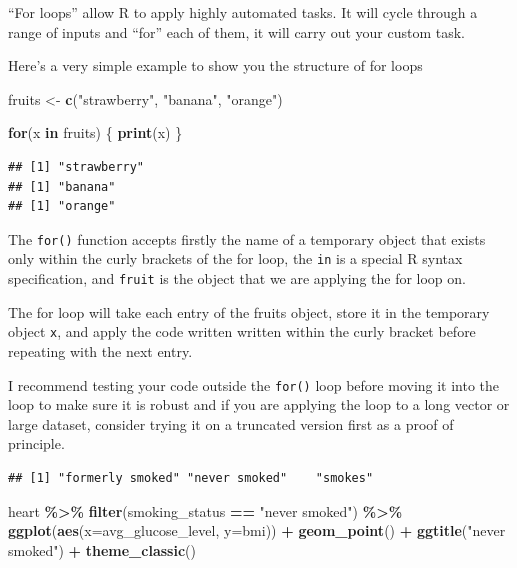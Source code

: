 \documentclass[
]{book}
\newenvironment{Shaded}{\begin{snugshade}}{\end{snugshade}}
\newcommand{\AttributeTok}[1]{\textcolor[rgb]{0.13,0.29,0.53}{#1}}
\newcommand{\ControlFlowTok}[1]{\textcolor[rgb]{0.13,0.29,0.53}{\textbf{#1}}}
\newcommand{\FunctionTok}[1]{\textcolor[rgb]{0.13,0.29,0.53}{\textbf{#1}}}
\newcommand{\NormalTok}[1]{#1}
\newcommand{\OtherTok}[1]{\textcolor[rgb]{0.56,0.35,0.01}{#1}}
\newcommand{\SpecialCharTok}[1]{\textcolor[rgb]{0.81,0.36,0.00}{\textbf{#1}}}
\newcommand{\StringTok}[1]{\textcolor[rgb]{0.31,0.60,0.02}{#1}}
\begin{document}
``For loops'' allow R to apply highly automated tasks. It will cycle through a range of inputs and ``for'' each of them, it will carry out your custom task.

Here's a very simple example to show you the structure of for loops

\begin{Shaded}
\begin{Highlighting}[]
\NormalTok{fruits }\OtherTok{\textless{}{-}} \FunctionTok{c}\NormalTok{(}\StringTok{"strawberry"}\NormalTok{, }\StringTok{"banana"}\NormalTok{, }\StringTok{"orange"}\NormalTok{)}

\ControlFlowTok{for}\NormalTok{(x }\ControlFlowTok{in}\NormalTok{ fruits) \{}
  \FunctionTok{print}\NormalTok{(x)}
\NormalTok{\}}
\end{Highlighting}
\end{Shaded}

\begin{verbatim}
## [1] "strawberry"
## [1] "banana"
## [1] "orange"
\end{verbatim}

The \texttt{for()} function accepts firstly the name of a temporary object that exists only within the curly brackets of the for loop, the \texttt{in} is a special R syntax specification, and \texttt{fruit} is the object that we are applying the for loop on.

The for loop will take each entry of the fruits object, store it in the temporary object \texttt{x}, and apply the code written written within the curly bracket before repeating with the next entry.

I recommend testing your code outside the \texttt{for()} loop before moving it into the loop to make sure it is robust and if you are applying the loop to a long vector or large dataset, consider trying it on a truncated version first as a proof of principle.

\begin{Shaded}
\end{Shaded}

\begin{verbatim}
## [1] "formerly smoked" "never smoked"    "smokes"
\end{verbatim}

\begin{Shaded}
\begin{Highlighting}[]
\NormalTok{heart }\SpecialCharTok{\%\textgreater{}\%} 
  \FunctionTok{filter}\NormalTok{(smoking\_status }\SpecialCharTok{==} \StringTok{"never smoked"}\NormalTok{) }\SpecialCharTok{\%\textgreater{}\%} 
  \FunctionTok{ggplot}\NormalTok{(}\FunctionTok{aes}\NormalTok{(}\AttributeTok{x=}\NormalTok{avg\_glucose\_level, }\AttributeTok{y=}\NormalTok{bmi)) }\SpecialCharTok{+}
  \FunctionTok{geom\_point}\NormalTok{() }\SpecialCharTok{+} 
  \FunctionTok{ggtitle}\NormalTok{(}\StringTok{"never smoked"}\NormalTok{) }\SpecialCharTok{+}
  \FunctionTok{theme\_classic}\NormalTok{()}
\end{Highlighting}
\end{Shaded}
\end{document}
